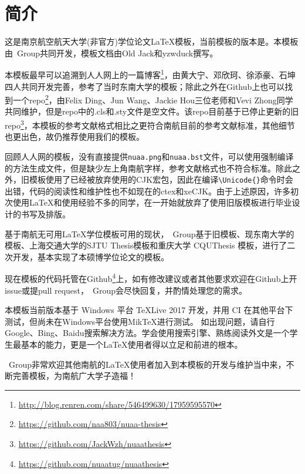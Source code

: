 \chapter{简介}\label{chap:intro}

这是南京航空航天大学(非官方)学位论文\LaTeX 模板，当前模板的版本是\version。本模板由\nuaathesis~Group共同开发，模板文档由Old Jack和yzwduck撰写。

本模板最早可以追溯到人人网上的一篇博客\footnote{\url{http://blog.renren.com/share/546499630/17959595570}}，由黄大宁、邓欣珂、徐添豪、石坤四人共同开发完善，参考了当时东南大学的\seuthesix 模板；除此之外在Github上也可以找到一个repo\footnote{\url{https://github.com/naa803/nuaa-thesis}}，由Felix Ding、Jun Wang、Jackie Hou三位老师和Vevi Zhong同学共同维护，但是repo中的.cls和.sty文件是空文件。该repo目前基于已停止更新的旧repo\footnote{\url{https://github.com/JackWzh/nuaathesis}}，本模板的参考文献格式相比之更符合南航目前的参考文献标准，其他细节也更出色，故仍推荐使用我们的模板。

回顾人人网的模板，没有直接提供\verb|nuaa.png|和\verb|nuaa.bst|文件，可以使用强制编译的方法生成文件，但是缺少左上角南航字样，参考文献格式也不符合标准。除此之外，旧模板使用了已经被放弃使用的CJK宏包，因此在编译\verb+\Unicode{}+命令时会出错，代码的阅读性和维护性也不如现在的ctex和xeCJK。由于上述原因，许多初次使用\LaTeX 和使用经验不多的同学，在一开始就放弃了使用旧版模板进行毕业设计的书写及排版。

基于南航无可用\LaTeX 学位模板可用的现状，\nuaathesis~Group基于旧\oldnuaathesis 模板、现东南大学的\seuthesix 模板、上海交通大学的SJTU Thesis模板和重庆大学 CQUThesis 模板，进行了二次开发，基本实现了本硕博学位论文的模板。

现在\nuaathesis 模板的代码托管在Github\footnote{\url{https://github.com/nuaatug/nuaathesis}}上，如有修改建议或者其他要求欢迎在Github上开issue或提pull request，\nuaathesis~Group会尽快回复，并酌情处理您的需求。

本模板当前版本基于 Windows 平台 \TeX Live 2017 开发，并用 CI 在其他平台下测试，但尚未在Windows平台使用Mik\TeX 进行测试。
如出现问题，请自行Google、Bing、Baidu搜索解决方法。学会使用搜索引擎、熟练阅读外文是一个学生最基本的能力，更是一个\LaTeX 使用者得以立足和前进的根本。

\nuaathesis~Group非常欢迎其他南航的\LaTeX 使用者加入到本模板的开发与维护当中来，不断完善模板，为南航广大学子造福！

